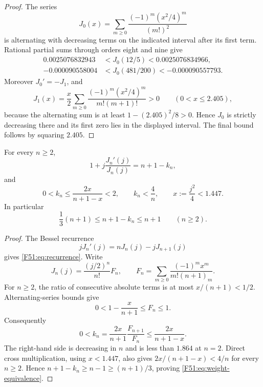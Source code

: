 \begin{proof}
The series
\begin{equation}
 J_0(x)=\sum_{m\ge0}\frac{(-1)^m(x^2/4)^m}{(m!)^2}
\end{equation}
is alternating with decreasing terms on the indicated interval after its
first term.  Rational partial sums through orders eight and nine give
\begin{align*}
 0.0025076832943&<J_0(12/5)<0.0025076834966,\\
 -0.000090558004&<J_0(481/200)<-0.000090557793.
\end{align*}
Moreover $J_0'=-J_1$, and
\begin{equation}
 J_1(x)=\frac x2\sum_{m\ge0}
 \frac{(-1)^m(x^2/4)^m}{m!(m+1)!}>0
 \qquad(0<x\le2.405),
\end{equation}
because the alternating sum is at least $1-(2.405)^2/8>0$.
Hence $J_0$ is strictly decreasing there and its first zero lies in the
displayed interval.  The final bound follows by squaring $2.405$.
\end{proof}

\begin{theorem}\label{F51:thm:bessel}
For every $n\ge2$,
\begin{equation}\label{F51:eq:recurrence}
 1+j\frac{J_n'(j)}{J_n(j)}=n+1-k_n,
\end{equation}
and
\begin{equation}\label{F51:eq:k-bounds}
 0<k_n\le \frac{2x}{n+1-x}<2,
 \qquad k_n<\frac4n,
 \qquad x:=\frac{j^2}{4}<1.447.
\end{equation}
In particular
\begin{equation}\label{F51:eq:weight-equivalence}
 \frac13(n+1)\le n+1-k_n\le n+1
 \qquad(n\ge2).
\end{equation}
\end{theorem}

\begin{proof}
The Bessel recurrence
\begin{equation}
 jJ_n'(j)=nJ_n(j)-jJ_{n+1}(j)
\end{equation}
gives \eqref{F51:eq:recurrence}.  Write
\begin{equation}
 J_n(j)=\frac{(j/2)^n}{n!}F_n,
 \qquad
 F_n=\sum_{m\ge0}\frac{(-1)^mx^m}{m!(n+1)_m}.
\end{equation}
For $n\ge2$, the ratio of consecutive absolute terms is at most
$x/(n+1)<1/2$.  Alternating-series bounds give
\begin{equation}
 0<1-\frac{x}{n+1}\le F_n\le1.
\end{equation}
Consequently
\begin{equation}
 0<k_n=\frac{2x}{n+1}\frac{F_{n+1}}{F_n}
 \le\frac{2x}{n+1-x}.
\end{equation}
The right-hand side is decreasing in $n$ and is less than $1.864$ at
$n=2$.  Direct cross multiplication, using $x<1.447$, also gives
$2x/(n+1-x)<4/n$ for every $n\ge2$.  Hence
$n+1-k_n\ge n-1\ge(n+1)/3$, proving
\eqref{F51:eq:weight-equivalence}.
\end{proof}

